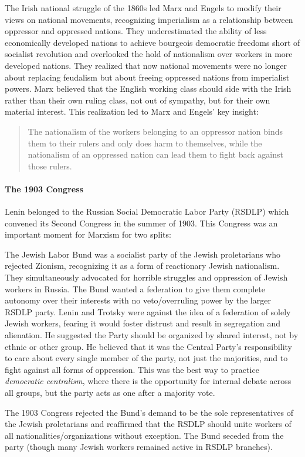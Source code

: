 The Irish national struggle of the 1860s led Marx and Engels to modify their views on national movements, recognizing imperialism as a relationship between oppressor and oppressed nations. They underestimated the ability of less economically developed nations to achieve bourgeois democratic freedoms short of socialist revolution and overlooked the hold of nationalism over workers in more developed nations. They realized that now national movements were no longer about replacing feudalism but about freeing oppressed nations from imperialist powers. Marx believed that the English working class should side with the Irish rather than their own ruling class, not out of sympathy, but for their own material interest. This realization led to Marx and Engels' key insight:

\blockquote{The nationalism of the workers belonging to an oppressor nation binds them to their rulers and only does harm to themselves, while the nationalism of an oppressed nation can lead them to fight back against those rulers.}

\paragraph{The 1903 Congress}

Lenin belonged to the Russian Social Democratic Labor Party (RSDLP) which convened its Second Congress in the summer of 1903. This Congress was an important moment for Marxism for two splits:

The Jewish Labor Bund was a socialist party of the Jewish proletarians who rejected Zionism, recognizing it as a form of reactionary Jewish nationalism. They simultaneously advocated for horrible struggles and oppression of Jewish workers in Russia. The Bund wanted a federation to give them complete autonomy over their interests with no veto/overruling power by the larger RSDLP party. Lenin and Trotsky were against the idea of a federation of solely Jewish workers, fearing it would foster distrust and result in segregation and alienation. He suggested the Party should be organized by shared interest, not by ethnic or other group. He believed that it was the Central Party's responsibility to care about every single member of the party, not just the majorities, and to fight against all forms of oppression. This was the best way to practice \emph{democratic centralism}, where there is the opportunity for internal debate across all groups, but the party acts as one after a majority vote.

The 1903 Congress rejected the Bund's demand to be the sole representatives of the Jewish proletarians and reaffirmed that the RSDLP should unite workers of all nationalities/organizations without exception. The Bund seceded from the party (though many Jewish workers remained active in RSDLP branches).

